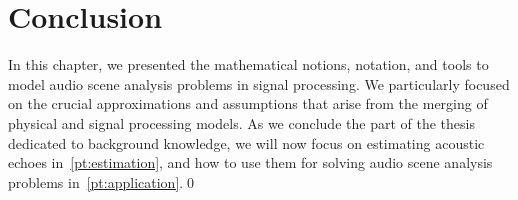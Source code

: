 \section{Conclusion}
In this chapter, we presented the mathematical notions, notation, and tools to model audio scene analysis problems in signal processing.
We particularly focused on the crucial approximations and assumptions that arise from the merging of physical and signal processing models.
As we conclude the part of the thesis dedicated to background knowledge, we will now focus on estimating acoustic echoes in~\cref{pt:estimation}, and how to use them for solving audio scene analysis problems in~\cref{pt:application}.\qed